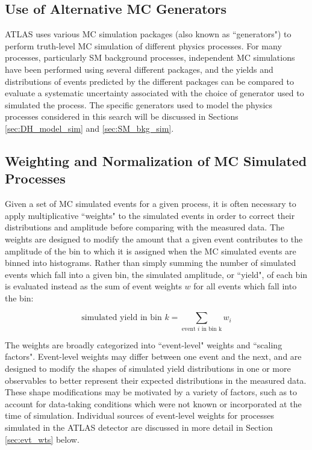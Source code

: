 \subsection{Use of Alternative MC Generators}

ATLAS uses various MC simulation packages (also known as ``generators") to perform truth-level MC simulation of different physics processes. For many processes, particularly SM background processes, independent MC simulations have been performed using several different packages, and the yields and distributions of events predicted by the different packages can be compared to evaluate a systematic uncertainty associated with the choice of generator used to simulated the process. The specific generators used to model the physics processes considered in this search will be discussed in Sections \ref{sec:DH_model_sim} and \ref{sec:SM_bkg_sim}.

\subsection{Weighting and Normalization of MC Simulated Processes}

Given a set of MC simulated events for a given process, it is often necessary to apply multiplicative ``weights" to the simulated events in order to correct their distributions and amplitude before comparing with the measured data. The weights are designed to modify the amount that a given event contributes to the amplitude of the bin to which it is assigned when the MC simulated events are binned into histograms. Rather than simply summing the number of simulated events which fall into a given bin, the simulated amplitude, or ``yield", of each bin is evaluated instead as the sum of event weights \(w\) for all events which fall into the bin:

\begin{equation}
\label{eq:weighted_bin_amplitude}
\text{simulated yield in bin \(k\)} = \sum_\text{event \(i\) in bin k} w_i
\end{equation}

The weights are broadly categorized into ``event-level" weights and ``scaling factors". Event-level weights may differ between one event and the next, and are designed to modify the shapes of simulated yield distributions in one or more observables to better represent their expected distributions in the measured data. These shape modifications may be motivated by a variety of factors, such as to account for data-taking conditions which were not known or incorporated at the time of simulation. Individual sources of event-level weights for processes simulated in the ATLAS detector are discussed in more detail in Section \ref{sec:evt_wts} below. 


